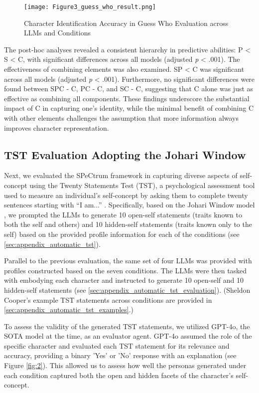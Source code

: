 \begin{figure}
    \centering
    \texttt{[image: Figure3\_guess\_who\_result.png]}
    \caption{Character Identification Accuracy in Guess Who Evaluation across LLMs and Conditions}
    \label{fig:3}
\end{figure}


The post-hoc analyses revealed a consistent hierarchy in predictive abilities: P < S < C, with significant differences across all models (adjusted \textit{p} < .001). The effectiveness of combining elements was also examined. SP < C was significant across all models (adjusted \textit{p} < .001). Furthermore, no significant differences were found between SPC - C, PC - C, and SC - C, suggesting that C alone was just as effective as combining all components. These findings underscore the substantial impact of C in capturing one's identity, while the minimal benefit of combining C with other elements challenges the assumption that more information always improves character representation.


\subsection{TST Evaluation Adopting the Johari Window}
Next, we evaluated the SPeCtrum framework in capturing diverse aspects of self-concept using the Twenty Statements Test (TST), a psychological assessment tool used to measure an individual's self-concept by asking them to complete twenty sentences starting with ``I am...'' \citep{kuhn2017empirical}. Specifically, based on the Johari Window model \citep{luft1955johari}, we prompted the LLMs to generate 10 open-self statements (traits known to both the self and others) and 10 hidden-self statements (traits known only to the self) based on the provided profile information for each of the conditions (see \ref{sec:appendix_automatic_tst}).

Parallel to the previous evaluation, the same set of four LLMs was provided with profiles constructed based on the seven conditions. The LLMs were then tasked with embodying each character and instructed to generate 10 open-self and 10 hidden-self statements (see \ref{sec:appendix_automatic_tst_evaluation}). (Sheldon Cooper's example TST statements across conditions are provided in \ref{sec:appendix_automatic_tst_examples}.)

To assess the validity of the generated TST statements, we utilized GPT-4o, the SOTA model at the time, as an evaluator agent. GPT-4o assumed the role of the specific character and evaluated each TST statement for its relevance and accuracy, providing a binary 'Yes' or 'No' response with an explanation (see Figure \ref{fig:2}). This allowed us to assess how well the personas generated under each condition captured both the open and hidden facets of the character's self-concept.

